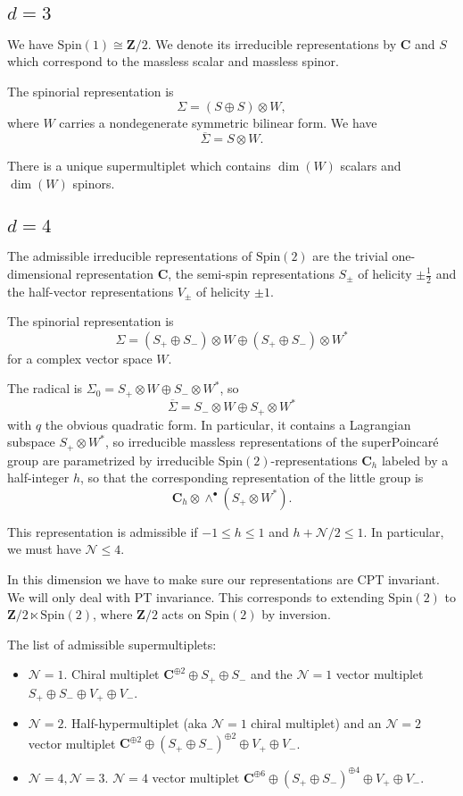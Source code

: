 \documentclass[12pt]{amsart}
\newcommand{\C}{\mathbf{C}}
\newcommand{\cN}{\mathcal{N}}
\newcommand{\Z}{\mathbf{Z}}
\newcommand{\Spin}{\mathrm{Spin}}
\theoremstyle{definition}
\theoremstyle{remark}
\begin{document}
\subsection{$d=3$}

We have $\Spin(1)\cong \Z/2$. We denote its irreducible representations by $\C$ and $S$ which correspond to the massless scalar and massless spinor.

The spinorial representation is
\[\Sigma = (S\oplus S)\otimes W,\]
where $W$ carries a nondegenerate symmetric bilinear form. We have
\[\overline{\Sigma} = S\otimes W.\]

There is a unique supermultiplet which contains $\dim(W)$ scalars and $\dim(W)$ spinors.

\subsection{$d=4$}

The admissible irreducible representations of $\Spin(2)$ are the trivial one-dimensional representation $\C$, the semi-spin representations $S_{\pm}$ of helicity $\pm\frac{1}{2}$ and the half-vector representations $V_{\pm}$ of helicity $\pm 1$.

The spinorial representation is
\[\Sigma = (S_+\oplus S_-)\otimes W\oplus (S_+\oplus S_-)\otimes W^*\]
for a complex vector space $W$.

The radical is $\Sigma_0 = S_+\otimes W\oplus S_-\otimes W^*$, so
\[\overline{\Sigma} = S_-\otimes W\oplus S_+\otimes W^*\]
with $q$ the obvious quadratic form. In particular, it contains a Lagrangian subspace $S_+\otimes W^*$, so irreducible massless representations of the superPoincar\'{e} group are parametrized by irreducible $\Spin(2)$-representations $\C_h$ labeled by a half-integer $h$, so that the corresponding representation of the little group is
\[\C_h\otimes \wedge^\bullet(S_+\otimes W^*).\]

This representation is admissible if $-1\leq h\leq 1$ and $h+\cN/2\leq 1$. In particular, we must have $\cN\leq 4$.

In this dimension we have to make sure our representations are CPT invariant. We will only deal with PT invariance. This corresponds to extending $\Spin(2)$ to $\Z/2\ltimes \Spin(2)$, where $\Z/2$ acts on $\Spin(2)$ by inversion.

The list of admissible supermultiplets:
\begin{itemize}
\item $\cN=1$. Chiral multiplet $\C^{\oplus 2}\oplus S_+\oplus S_-$ and the $\cN=1$ vector multiplet $S_+\oplus S_-\oplus V_+\oplus V_-$.

\item $\cN=2$. Half-hypermultiplet (aka $\cN=1$ chiral multiplet) and an $\cN=2$ vector multiplet $\C^{\oplus 2}\oplus (S_+\oplus S_-)^{\oplus 2}\oplus V_+\oplus V_-$.

\item $\cN=4, \cN=3$. $\cN=4$ vector multiplet $\C^{\oplus 6}\oplus (S_+\oplus S_-)^{\oplus 4}\oplus V_+\oplus V_-$.
\end{itemize}
\end{document}
